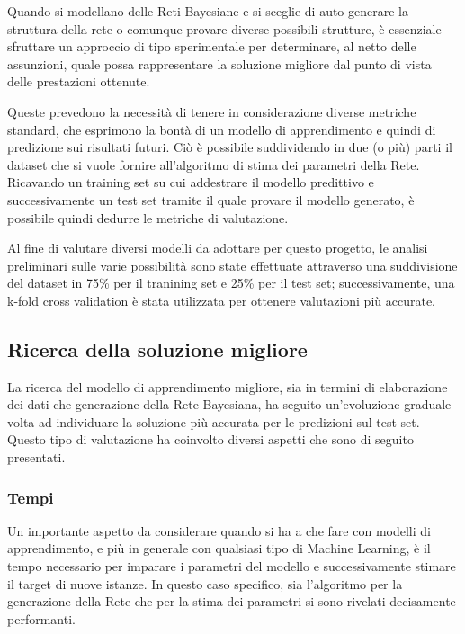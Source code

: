 \documentclass[hidelinks, 12pt]{article}
\begin{document}
Quando si modellano delle Reti Bayesiane e si sceglie di auto-generare la struttura della rete o comunque provare diverse possibili strutture, è essenziale sfruttare un approccio di tipo sperimentale per determinare, al netto delle assunzioni, quale possa rappresentare la soluzione migliore dal punto di vista delle prestazioni ottenute.

Queste prevedono la necessità di tenere in considerazione diverse metriche standard, che esprimono la bontà di un modello di apprendimento e quindi di predizione sui risultati futuri. Ciò è possibile suddividendo in due (o più) parti il dataset che si vuole fornire all'algoritmo di stima dei parametri della Rete. Ricavando un training set su cui addestrare il modello predittivo e successivamente un test set tramite il quale provare il modello generato, è possibile quindi dedurre le metriche di valutazione.

Al fine di valutare diversi modelli da adottare per questo progetto, le analisi preliminari sulle varie possibilità sono state effettuate attraverso una suddivisione del dataset in 75\% per il tranining set e 25\% per il test set; successivamente, una k-fold cross validation è stata utilizzata per ottenere valutazioni più accurate.



\subsection{Ricerca della soluzione migliore}

La ricerca del modello di apprendimento migliore, sia in termini di elaborazione dei dati che generazione della Rete Bayesiana, ha seguito un'evoluzione graduale volta ad individuare la soluzione più accurata per le predizioni sul test set. Questo tipo di valutazione ha coinvolto diversi aspetti che sono di seguito presentati.


\subsubsection{Tempi}

Un importante aspetto da considerare quando si ha a che fare con modelli di apprendimento, e più in generale con qualsiasi tipo di Machine Learning, è il tempo necessario per imparare i parametri del modello e successivamente stimare il target di nuove istanze. In questo caso specifico, sia l'algoritmo per la generazione della Rete che per la stima dei parametri si sono rivelati decisamente performanti.
\end{document}
